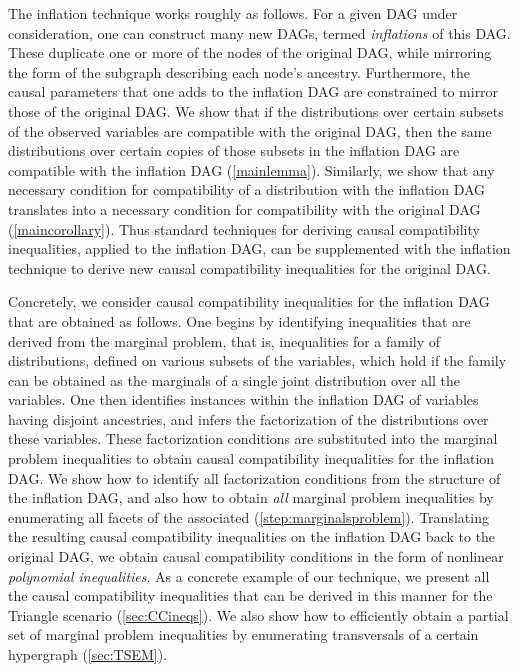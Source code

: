 \documentclass[aps,english,superscriptaddress,onecolumn,twoside,longbibliography,pra,floatfix,fleqn,nofootinbib]{revtex4-1}%
\newcommand*{\tblue}[1]{{\color{MidnightBlue}{\textbf{#1}}}}
\theoremstyle{definition}
\newcounter{example}[section]
\begin{document}
The inflation technique works roughly as follows. For a given DAG under consideration, one can construct many new DAGs, termed {\em inflations} of this DAG. These duplicate one or more of the nodes of the original DAG, while mirroring the form of the subgraph describing each node's ancestry.
Furthermore, the causal parameters that one adds to the inflation DAG are constrained to mirror those of the original DAG.  We show that if the distributions over certain subsets of the observed variables are compatible with the original DAG, then the same distributions over certain copies of those subsets in the inflation DAG are compatible with the inflation DAG (\cref{mainlemma}).  Similarly, we show that any necessary condition for compatibility of a distribution with the inflation DAG translates into a necessary condition for compatibility with the original DAG (\cref{maincorollary}).  Thus standard techniques for deriving causal compatibility inequalities, applied to the inflation DAG,  can be supplemented with the inflation technique to derive new causal compatibility inequalities for the original DAG.  

Concretely, we consider causal compatibility inequalities for the inflation DAG that are obtained as follows.  One begins by identifying inequalities that are derived from the marginal problem, that is, inequalities for a family of distributions, defined on various subsets of the variables, which hold if the family can be obtained as the marginals of a single joint distribution over all the variables.  One then identifies instances within the inflation DAG of variables having disjoint ancestries, and infers the factorization of the distributions over these variables.  These factorization conditions are substituted into the marginal problem inequalities to obtain causal compatibility inequalities for the inflation DAG. 
We show how to identify all factorization conditions from the structure of the inflation DAG, and also how to obtain {\em all} marginal problem inequalities by enumerating all facets of the associated \tblue{marginal polytope} (\cref{step:marginalsproblem}).  Translating the resulting causal compatibility inequalities on the inflation DAG back to the original DAG, we obtain causal compatibility conditions in the form of nonlinear \emph{polynomial inequalities}. As a concrete example of our technique, we present all the causal compatibility inequalities that can be derived in this manner for the Triangle scenario (\cref{sec:CCineqs}). We also show how to efficiently obtain a partial set of marginal problem inequalities  by enumerating transversals of a certain hypergraph (\cref{sec:TSEM}). 
\end{document}
